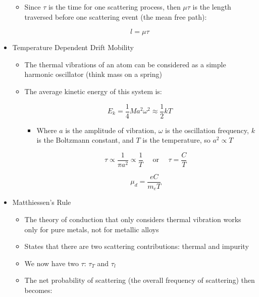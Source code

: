 \begin{itemize}
\begin{itemize}
      \item Since $\tau$ is the time for one scattering process, then $\mu\tau$ is the length traversed before one scattering event (the mean free path):

        $$l=\mu\tau$$

    \end{itemize}

  \item Temperature Dependent Drift Mobility

    \begin{itemize}

      \item The thermal vibrations of an atom can be considered as a simple harmonic oscillator (think mass on a spring)

      \item The average kinetic energy of this system is:

        $$E_k=\frac{1}{4}Ma^2\omega^2\approx \frac{1}{2}kT$$

        \begin{itemize}

          \item Where $a$ is the amplitude of vibration, $\omega$ is the oscillation frequency, $k$ is the Boltzmann constant, and $T$ is the temperature, so $a^2\propto T$

            $$\tau\propto\frac{1}{\pi a^2}\propto\frac{1}{T}\quad\text{ or }\quad \tau=\frac{C}{T}$$

            $$\mu_d=\frac{eC}{m_eT}$$

        \end{itemize}

    \end{itemize}

  \item Matthiessen's Rule

    \begin{itemize}

      \item The theory of conduction that only considers thermal vibration works only for pure metals, not for metallic alloys

      \item States that there are two scattering contributions: thermal and impurity

      \item We now have two $\tau$: $\tau_T$ and $\tau_l$

      \item The net probability of scattering (the overall frequency of scattering) then becomes:


\end{itemize}
\end{itemize}
